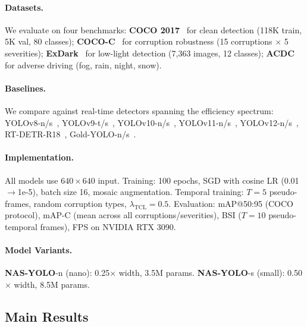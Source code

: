 \documentclass[review]{eccv2026}
\newcommand{\ours}{\textbf{NAS-YOLO}}
\begin{document}
\paragraph{Datasets.}
We evaluate on four benchmarks:
\textbf{COCO 2017}~\cite{coco} for clean detection (118K train, 5K val, 80 classes);
\textbf{COCO-C}~\cite{cococ} for corruption robustness (15 corruptions $\times$ 5 severities);
\textbf{ExDark}~\cite{exdark} for low-light detection (7,363 images, 12 classes);
\textbf{ACDC}~\cite{acdc} for adverse driving (fog, rain, night, snow).

\paragraph{Baselines.}
We compare against real-time detectors spanning the efficiency spectrum:
YOLOv8-n/s~\cite{yolov8},
YOLOv9-t/s~\cite{yolov9},
YOLOv10-n/s~\cite{yolov10},
YOLOv11-n/s~\cite{yolov11},
YOLOv12-n/s~\cite{yolov12},
RT-DETR-R18~\cite{rtdetr},
Gold-YOLO-n/s~\cite{goldyolo}.

\paragraph{Implementation.}
All models use $640 \times 640$ input. Training: 100 epochs, SGD with cosine LR (0.01$\to$1e-5), batch size 16, mosaic augmentation.
Temporal training: $T=5$ pseudo-frames, random corruption types, $\lambda_\text{TCL}=0.5$.
Evaluation: mAP@50:95 (COCO protocol), mAP-C (mean across all corruptions/severities), BSI ($T=10$ pseudo-temporal frames), FPS on NVIDIA RTX 3090.

\paragraph{Model Variants.}
\ours{}-n (nano): 0.25$\times$ width, 3.5M params.
\ours{}-s (small): 0.50$\times$ width, 8.5M params.

\subsection{Main Results}
\end{document}
